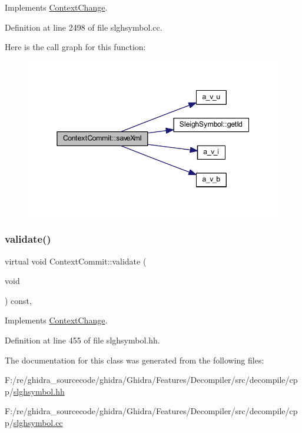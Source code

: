 Implements \mbox{\hyperlink{class_context_change_a9874429eee192c35909a130dfdbbc83d}{Context\+Change}}.



Definition at line 2498 of file slghsymbol.\+cc.

Here is the call graph for this function\+:
\nopagebreak
\begin{figure}[H]
\begin{center}
\leavevmode
\includegraphics[width=345pt]{class_context_commit_a38e0c54f39dba0542a8433401980d78e_cgraph}
\end{center}
\end{figure}
\mbox{\label{class_context_commit_a11c0204a16fbbb69fedf147aebde173c}} 
\subsubsection{\texorpdfstring{validate()}{validate()}}
{\footnotesize\ttfamily virtual void Context\+Commit\+::validate (\begin{DoxyParamCaption}\item[{void}]{ }\end{DoxyParamCaption}) const\hspace{0.3cm}{\ttfamily [inline]}, {\ttfamily [virtual]}}



Implements \mbox{\hyperlink{class_context_change_a9a9263347e16d2e396e3963a43eb7ea8}{Context\+Change}}.



Definition at line 455 of file slghsymbol.\+hh.



The documentation for this class was generated from the following files\+:\begin{DoxyCompactItemize}
\item 
F\+:/re/ghidra\+\_\+sourcecode/ghidra/\+Ghidra/\+Features/\+Decompiler/src/decompile/cpp/\mbox{\hyperlink{slghsymbol_8hh}{slghsymbol.\+hh}}\item 
F\+:/re/ghidra\+\_\+sourcecode/ghidra/\+Ghidra/\+Features/\+Decompiler/src/decompile/cpp/\mbox{\hyperlink{slghsymbol_8cc}{slghsymbol.\+cc}}\end{DoxyCompactItemize}
